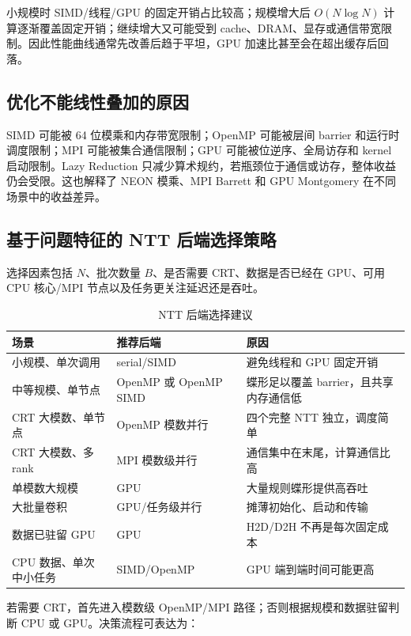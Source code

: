 小规模时 SIMD/线程/GPU 的固定开销占比较高；规模增大后 $O(N\log N)$ 计算逐渐覆盖固定开销；继续增大又可能受到 cache、DRAM、显存或通信带宽限制。因此性能曲线通常先改善后趋于平坦，GPU 加速比甚至会在超出缓存后回落。

\subsection{优化不能线性叠加的原因}

SIMD 可能被 64 位模乘和内存带宽限制；OpenMP 可能被层间 barrier 和运行时调度限制；MPI 可能被集合通信限制；GPU 可能被位逆序、全局访存和 kernel 启动限制。Lazy Reduction 只减少算术规约，若瓶颈位于通信或访存，整体收益仍会受限。这也解释了 NEON 模乘、MPI Barrett 和 GPU Montgomery 在不同场景中的收益差异。

\subsection{基于问题特征的 NTT 后端选择策略}\newwork

选择因素包括 $N$、批次数量 $B$、是否需要 CRT、数据是否已经在 GPU、可用 CPU 核心/MPI 节点以及任务更关注延迟还是吞吐。

\begin{table}[H]
  \centering
  \caption{NTT 后端选择建议}
  \label{tab:backend-choice}
  \small
  \begin{tabularx}{\textwidth}{p{3.6cm} p{3.6cm} X}
    \toprule
    场景 & 推荐后端 & 原因 \\
    \midrule
    小规模、单次调用 & serial/SIMD & 避免线程和 GPU 固定开销 \\
    中等规模、单节点 & OpenMP 或 OpenMP SIMD & 蝶形足以覆盖 barrier，且共享内存通信低 \\
    CRT 大模数、单节点 & OpenMP 模数并行 & 四个完整 NTT 独立，调度简单 \\
    CRT 大模数、多 rank & MPI 模数级并行 & 通信集中在末尾，计算通信比高 \\
    单模数大规模 & GPU & 大量规则蝶形提供高吞吐 \\
    大批量卷积 & GPU/任务级并行 & 摊薄初始化、启动和传输 \\
    数据已驻留 GPU & GPU & H2D/D2H 不再是每次固定成本 \\
    CPU 数据、单次中小任务 & SIMD/OpenMP & GPU 端到端时间可能更高 \\
    \bottomrule
  \end{tabularx}
\end{table}

若需要 CRT，首先进入模数级 OpenMP/MPI 路径；否则根据规模和数据驻留判断 CPU 或 GPU。决策流程可表达为：

